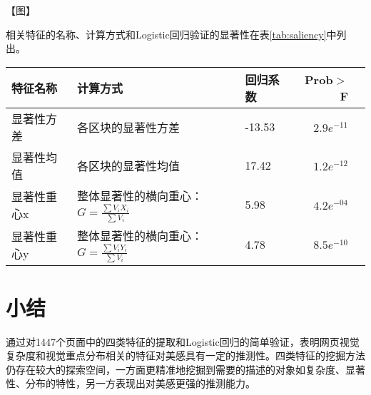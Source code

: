 【图】

相关特征的名称、计算方式和Logistic回归验证的显著性在表\ref{tab:saliency}中列出。

\begin{table}[H]
  \centering
  \small
  \begin{tabular}{lllrr}
    \hline
     特征名称 & 计算方式 & 回归系数 & Prob$>$F \\
    \hline
    显著性方差 & 各区块的显著性方差 & -13.53 & $2.9e^{-11}$\\
    显著性均值 & 各区块的显著性均值 & 17.42 & $1.2e^{-12}$\\
    显著性重心x & 整体显著性的横向重心：$G = \frac{\sum V_i X_i}{\sum V_i}$& 5.98 & $4.2e^{-04}$\\
    显著性重心y & 整体显著性的横向重心：$G = \frac{\sum V_i Y_i}{\sum V_i}$ & 4.78 & $8.5e^{-10}$\\
    \hline
  \end{tabular}
\end{table}


\section{小结}
通过对1447个页面中的四类特征的提取和Logistic回归的简单验证，表明网页视觉复杂度和视觉重点分布相关的特征对美感具有一定的推测性。四类特征的挖掘方法仍存在较大的探索空间，一方面更精准地挖掘到需要的描述的对象如复杂度、显著性、分布的特性，另一方表现出对美感更强的推测能力。
